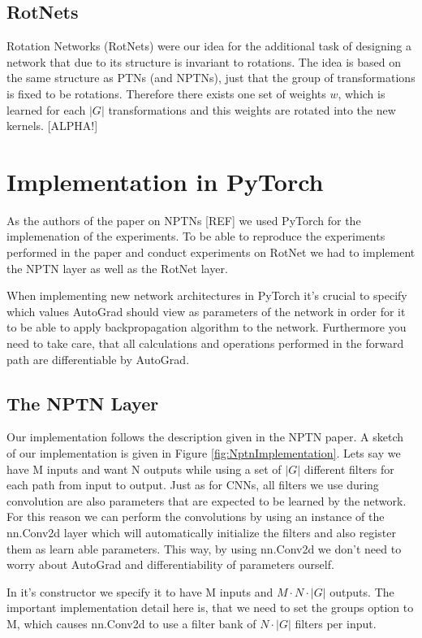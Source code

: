 \documentclass{llncs}
\begin{document}
\subsection{RotNets}
Rotation Networks (RotNets) were our idea for the additional task of designing a network that due to its structure is invariant to rotations. 
The idea is based on the same structure as PTNs (and NPTNs), just that the group of transformations is fixed to be rotations. Therefore there exists one set of weights $w$, which is learned for each $|G|$ transformations and this weights are rotated into the new kernels. 
[ALPHA!]

\section{Implementation in PyTorch}
As the authors of the paper on NPTNs [REF] we used PyTorch for the implemenation of the experiments.
To be able to reproduce the experiments performed in the paper and conduct experiments on RotNet we had to implement the NPTN layer as well as the RotNet layer.

When implementing new network architectures in PyTorch it's crucial to specify which values AutoGrad should view as parameters of the network in order for it to be able to apply backpropagation algorithm to the network. Furthermore you need to take care, that all calculations and operations performed in the forward path are differentiable by AutoGrad.
\subsection{The NPTN Layer}
Our implementation follows the description given in the NPTN paper. A sketch of our implementation is given in Figure \ref{fig:NptnImplementation}.
Lets say we have M inputs and want N outputs while using a set of $|G|$ different filters for each path from input to output.
Just as for CNNs, all filters we use during convolution are also parameters that are expected to be learned by the network.
For this reason we can perform the convolutions by using an instance of the nn.Conv2d layer which will automatically initialize the filters and also register them as learn able parameters. This way, by using nn.Conv2d we don't need to worry about AutoGrad and differentiability of parameters ourself.

In it's constructor we specify it to have M inputs and $M \cdot N \cdot |G|$ outputs. The important implementation detail here is, that we need to set the groups option to M, which causes nn.Conv2d to use a filter bank of $N\cdot|G|$ filters per input.
\end{document}
